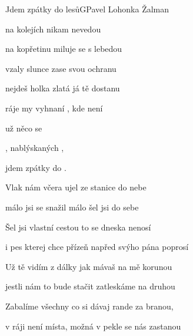 \setcounter{page}{39}
\begin{song}{Jdem zpátky do lesů}{G}{Pavel Lohonka Žalman}

\begin{SBVerse}

 na kolejích  nikam nevedou

 na kopřetinu  miluje se s lebedou

 vzaly slunce zase  svou ochranu

 nejdeš holka zlatá  já tě dostanu

\end{SBVerse}

\begin{SBChorus}

 ráje my vyhnaní , kde není

už   něco se 

, nablýskaných ,

jdem zpátky do .  

\end{SBChorus}

\begin{SBVerse}

Vlak nám včera ujel ze stanice do nebe

málo jsi se snažil málo šel jsi do sebe

Šel jsi vlastní cestou to se dneska nenosí

i pes kterej chce přízeň napřed svýho pána poprosí

\end{SBVerse}

\begin{SBChorus}

\end{SBChorus}

\begin{SBVerse}

Už tě vidím z dálky jak mávaš na mě korunou

jestli nám to bude stačit zatleskáme na druhou

Zabalíme všechny co si dávaj rande za branou,

v ráji není místa, možná v pekle se nás zastanou

\end{SBVerse}

\begin{SBChorus}

\end{SBChorus}

\end{song}

\clearpage
